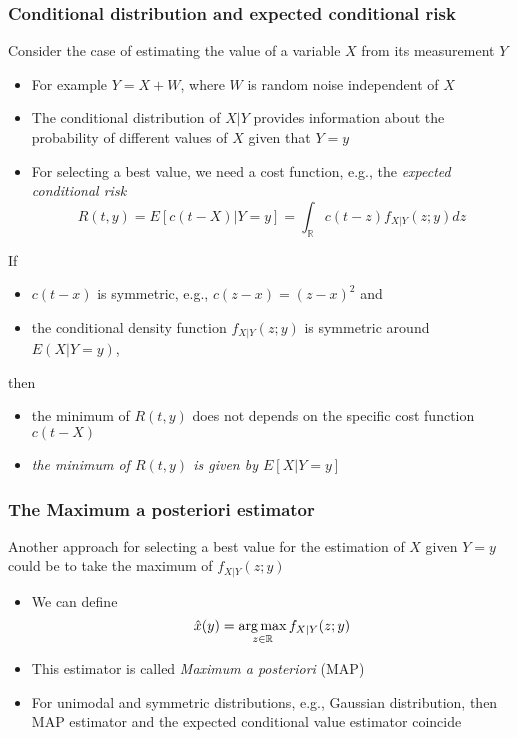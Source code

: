 \begin{frame}
	\frametitle{Conditional distribution and expected conditional risk}
	Consider the case of estimating the value of a variable $X$ from its measurement $Y$
	\begin{itemize}
		\item For example $Y=X+W$, where $W$ is random noise independent of $X$
		\item The conditional distribution of $X|Y$ provides information about the probability of different values of $X$ given that $Y=y$
		\item <3-> For selecting a best value, we need a cost function, e.g., the \emph{expected conditional risk}
		$$R(t,y)=E[c(t-X)|Y=y]=\int_{\mathbb{R}}c(t-z)f_{X|Y}(z;y)dz$$
	\end{itemize}
	
	If
	\begin{itemize}
		\item $c(t-x)$ is symmetric, e.g., $c(z-x)=(z-x)^2$ and
		\item the conditional density function $f_{X|Y}(z;y)$ is symmetric around $E(X|Y=y)$,
	\end{itemize}
	then
	\begin{itemize}
		\item the minimum of $R(t,y)$ does not depends on the specific cost function $c(t-X)$
		\item \emph{the minimum of $R(t,y)$ is given by $E[X|Y=y]$}
	\end{itemize}
\end{frame}

\begin{frame}
	\frametitle{The Maximum a posteriori estimator}
	Another approach for selecting a best value for the estimation of $X$ given $Y=y$ could be to take the maximum of $f_{X|Y}(z;y)$ \vspace{2em}
	\begin{itemize}
		\item We can define $$\hat{x}(y)=\operatorname*{arg\,max}_{z\in\mathbb{R}}f_{X|Y}(z;y)$$
		\item This estimator is called \emph{Maximum a posteriori} (MAP) 
	\end{itemize}
	\begin{itemize}
		\item For unimodal and symmetric distributions, e.g., Gaussian distribution, then MAP estimator and the expected conditional value estimator coincide
	\end{itemize}
\end{frame}

